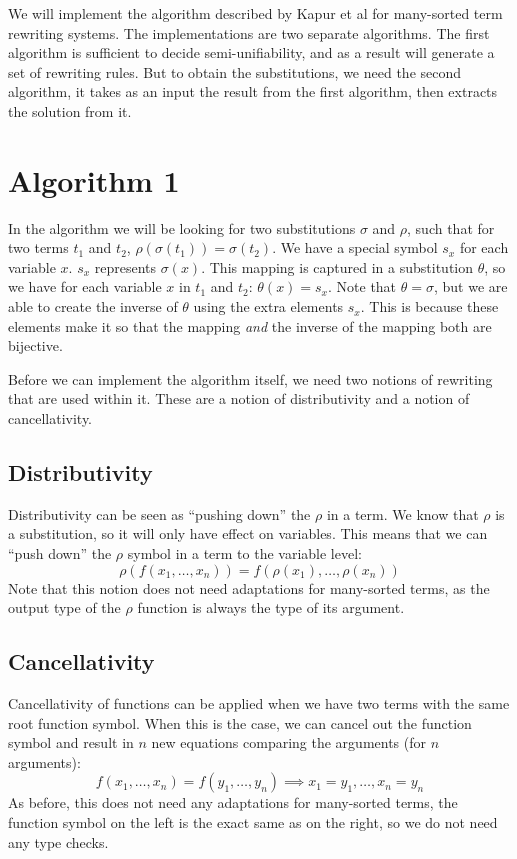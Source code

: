We will implement the algorithm described by Kapur et al for many-sorted term rewriting systems. The implementations are two separate algorithms. The first algorithm is sufficient to decide semi-unifiability, and as a result will generate a set of rewriting rules. But to obtain the substitutions, we need the second algorithm, it takes as an input the result from the first algorithm, then extracts the solution from it.

\section{Algorithm 1}
In the algorithm we will be looking for two substitutions $\sigma$ and $\rho$, such that for two terms $t_1$ and $t_2$, $\rho(\sigma(t_1)) = \sigma(t_2)$. We have a special symbol $s_x$ for each variable $x$. $s_x$ represents $\sigma(x)$. This mapping is captured in a substitution $\theta$, so we have for each variable $x$ in $t_1$ and $t_2$: $\theta(x) = s_x$. Note that $\theta = \sigma$, but we are able to create the inverse of $\theta$ using the extra elements $s_x$. This is because these elements make it so that the mapping \textit{and} the inverse of the mapping both are bijective. 

Before we can implement the algorithm itself, we need two notions of rewriting that are used within it. These are a notion of distributivity and a notion of cancellativity. 
\subsection{Distributivity}
Distributivity can be seen as ``pushing down'' the $\rho$ in a term. We know that $\rho$ is a substitution, so it will only have effect on variables. This means that we can ``push down'' the $\rho$ symbol in a term to the variable level:
$$ \rho(f(x_1, \dots, x_n)) = f(\rho(x_1), \dots, \rho(x_n)) $$
Note that this notion does not need adaptations for many-sorted terms, as the output type of the $\rho$ function is always the type of its argument. 
\subsection{Cancellativity}
Cancellativity of functions can be applied when we have two terms with the same root function symbol. When this is the case, we can cancel out the function symbol and result in $n$ new equations comparing the arguments (for $n$ arguments):
$$ f(x_1, \dots, x_n) = f(y_1, \dots, y_n) \implies x_1 = y_1, \dots, x_n = y_n $$
As before, this does not need any adaptations for many-sorted terms, the function symbol on the left is the exact same as on the right, so we do not need any type checks. 
